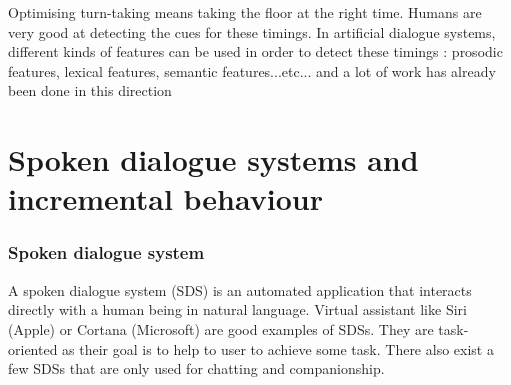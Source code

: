         Optimising turn-taking means taking the floor at the right time. Humans are very good at detecting the cues for these timings. In artificial dialogue systems, different kinds of features can be used in order to detect these timings \cite{Gravano2011}: prosodic features, lexical features, semantic features...etc... and a lot of work has already been done in this direction \cite{Meena2013} 
        
    
\section{Spoken dialogue systems and incremental behaviour}
    
    	\subsubsection{Spoken dialogue system}
        \label{soa:sds}
        
        	A spoken dialogue system (SDS) is an automated application that interacts directly with a human being in natural language. Virtual assistant like Siri (Apple) or Cortana (Microsoft) are good examples of SDSs. They are task-oriented as their goal is to help to user to achieve some task. There also exist a few SDSs that are only used for chatting and companionship.
            
